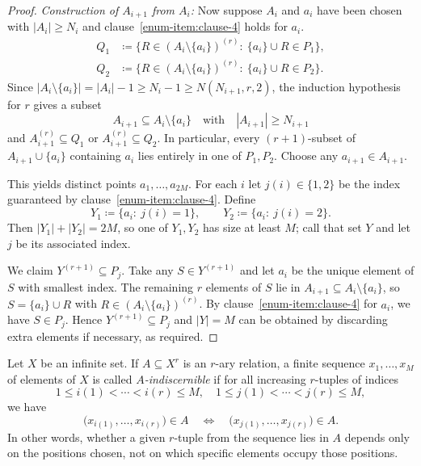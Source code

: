 \begin{proof}
    \textit{Construction of $A_{i+1}$ from $A_i$: }Now suppose $A_i$ and $a_i$ have been chosen with $|A_i|\ge N_i$ and clause~\ref{enum-item:clause-4} holds for $a_i$.
    \[
        \begin{aligned}
            Q_1&\coloneqq\{R\in (A_i\setminus\{a_i\})^{(r)}:\ \{a_i\}\cup R\in P_1\},\\
            Q_2&\coloneqq\{R\in (A_i\setminus\{a_i\})^{(r)}:\ \{a_i\}\cup R\in P_2\}.
        \end{aligned}
    \]
    Since $|A_i\setminus\{a_i\}|=|A_i|-1\ge N_i-1\ge N(N_{i+1},r,2)$, the induction hypothesis for $r$ gives a subset
    \[
        A_{i+1}\subseteq A_i\setminus\{a_i\} \quad\text{with}\quad |A_{i+1}|\ge N_{i+1}
    \]
    and $A_{i+1}^{(r)}\subseteq Q_1$ or $A_{i+1}^{(r)}\subseteq Q_2$. In particular, every $(r+1)$-subset of $A_{i+1}\cup\{a_i\}$ containing $a_i$ lies entirely in one of $P_1,P_2$. Choose any $a_{i+1}\in A_{i+1}$.

    This yields distinct points $a_1,\dots,a_{2M}$. For each $i$ let $j(i)\in\{1,2\}$ be the index guaranteed by clause~\ref{enum-item:clause-4}. Define
    \[
        Y_1\coloneqq\{a_i:\ j(i)=1\},\qquad Y_2\coloneqq\{a_i:\ j(i)=2\}.
    \]
    Then $|Y_1|+|Y_2|=2M$, so one of $Y_1,Y_2$ has size at least $M$; call that set $Y$ and let $j$ be its associated index.

    We claim $Y^{(r+1)}\subseteq P_j$. Take any $S\in Y^{(r+1)}$ and let $a_i$ be the unique element of $S$ with smallest index. The remaining $r$ elements of $S$ lie in $A_{i+1}\subseteq A_i\setminus\{a_i\}$, so $S=\{a_i\}\cup R$ with $R\in (A_i\setminus\{a_i\})^{(r)}$. By clause~\ref{enum-item:clause-4} for $a_i$, we have $S\in P_j$. Hence $Y^{(r+1)}\subseteq P_j$ and  $|Y|=M$ can be obtained by discarding extra elements if necessary, as required.

\end{proof}

Let $X$ be an infinite set.
If $A \subseteq X^r$ is an $r$-ary relation, a finite sequence $x_1, \dots, x_M$ of elements of $X$ is called \emph{$A$-indiscernible} if for all increasing $r$-tuples of indices
\[
    1 \le i(1) < \cdots < i(r) \le M, \quad 1 \le j(1) < \cdots < j(r) \le M,
\]
we have
\[
    \bigl(x_{i(1)}, \dots, x_{i(r)}\bigr) \in A
    \quad\Longleftrightarrow\quad
    \bigl(x_{j(1)}, \dots, x_{j(r)}\bigr) \in A.
\]
In other words, whether a given $r$-tuple from the sequence lies in $A$ depends only on the positions chosen, not on which specific elements occupy those positions.


